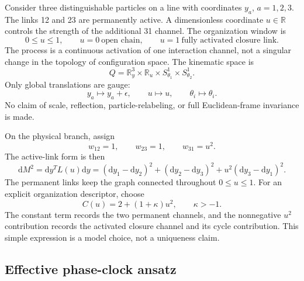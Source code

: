 \documentclass[11pt]{article}
\theoremstyle{plain}
\newcommand{\dd}{\mathrm d}
\newcommand{\R}{\mathbb R}
\begin{document}
Consider three distinguishable particles on a line with coordinates $y_a$, $a=1,2,3$. The links 12 and 23 are permanently active. A dimensionless coordinate $u\in\R$ controls the strength of the additional 31 channel. The organization window is
\begin{equation}
0\le u\le1,\qquad u=0\ \text{open chain},\qquad u=1\ \text{fully activated closure link}.
\end{equation}
The process is a continuous activation of one interaction channel, not a singular change in the topology of configuration space. The kinematic space is
\begin{equation}
Q=\R_y^3\times\R_u\times S^1_{\theta_1}\times S^1_{\theta_2}.
\end{equation}
Only global translations are gauge:
\begin{equation}
y_a\mapsto y_a+\epsilon,\qquad u\mapsto u,\qquad\theta_i\mapsto\theta_i.
\end{equation}
No claim of scale, reflection, particle-relabeling, or full Euclidean-frame invariance is made.

On the physical branch, assign
\begin{equation}
w_{12}=1,\qquad w_{23}=1,\qquad w_{31}=u^2.
\end{equation}
The active-link form is then
\begin{equation}
\dd M^2=\dd y^TL(u)\dd y=(\dd y_1-\dd y_2)^2+(\dd y_2-\dd y_3)^2+u^2(\dd y_3-\dd y_1)^2.
\end{equation}
The permanent links keep the graph connected throughout $0\le u\le1$. For an explicit organization descriptor, choose
\begin{equation}
C(u)=2+(1+\kappa)u^2,\qquad\kappa>-1.
\end{equation}
The constant term records the two permanent channels, and the nonnegative $u^2$ contribution records the activated closure channel and its cycle contribution. This simple expression is a model choice, not a uniqueness claim.

\subsection{Effective phase-clock ansatz}
\end{document}
